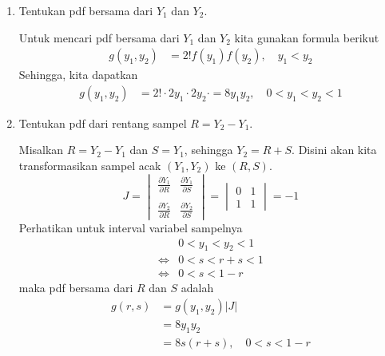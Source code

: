 \documentclass{exam}
\newcommand{\del}{\partial}
\begin{document}
\begin{enumerate}
\begin{enumerate}
\begin{solution}
            \end{solution}
            \item Tentukan pdf bersama dari $Y_1$ dan $Y_2$.
            \begin{solution}
                Untuk mencari pdf bersama dari $Y_1$ dan $Y_2$ kita gunakan formula berikut
                \begin{align*}
                    g(y_1,y_2) &= 2!f(y_1)f(y_2), \quad y_1<y_2
                \end{align*}
                Sehingga, kita dapatkan
                \begin{align*}
                    g(y_1,y_2) &= 2!\cdot 2y_1\cdot 2y_2\cdot = 8y_1y_2, \quad 0<y_1<y_2<1
                \end{align*}
            \end{solution}
            \item Tentukan pdf dari rentang sampel $R=Y_2-Y_1$.
            \begin{solution}
                Misalkan $R=Y_2-Y_1$ dan $S=Y_1$, sehingga $Y_2=R+S$. Disini akan kita transformasikan sampel acak $(Y_1,Y_2)$ ke $(R,S)$.
                \[J=\begin{vmatrix}
                    \displaystyle\frac{\del Y_1}{\del R} & \displaystyle\frac{\del Y_1}{\del S}\\\\
                    \displaystyle\frac{\del Y_2}{\del R} & \displaystyle\frac{\del Y_2}{\del S}
                \end{vmatrix}=\begin{vmatrix}
                    0 & 1\\
                    1 & 1
                \end{vmatrix}=-1\] 
                Perhatikan untuk interval variabel sampelnya
                \begin{align*}
                    &0<y_1<y_2<1\\
                    \iff& 0<s<r+s<1\\
                    \iff& 0<s<1-r
                \end{align*}
                maka pdf bersama dari $R$ dan $S$ adalah
                \begin{align*}
                    g(r,s) &= g(y_1,y_2)|J|\\
                    &= 8y_1y_2\\
                    &= 8s(r+s),\quad 0<s<1-r
                \end{align*}

\end{solution}
\end{enumerate}
\end{enumerate}
\end{document}
